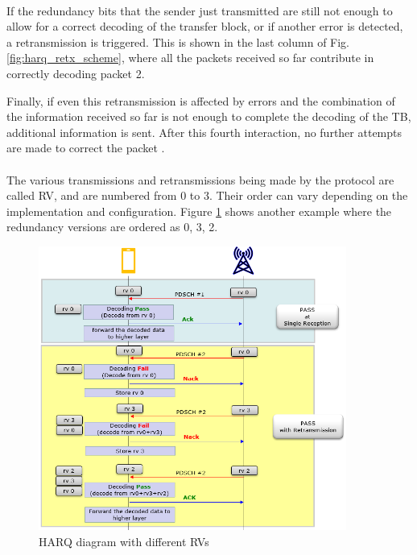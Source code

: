 \paragraph{} If the redundancy bits that the sender just transmitted are still not enough to allow for a correct decoding of the transfer block, or if another error is detected, a retransmission is triggered. This is shown in the last column of Fig. \ref{fig:harq_retx_scheme}, where all the packets received so far contribute in correctly decoding packet 2.

Finally, if even this retransmission is affected by errors and the combination of the information received so far is not enough to complete the decoding of the \ac{TB}, additional information is sent. After this fourth interaction, no further attempts are made to correct the packet \cite{5g-nr-harq-sharetechnote}.

\paragraph{} The various transmissions and retransmissions being made by the protocol are called \ac{RV}, and are numbered from 0 to 3. Their order can vary depending on the implementation and configuration. Figure \ref{fig:harq_retx_scheme_2} shows another example where the redundancy versions are ordered as 0, 3, 2.

\begin{figure}[ht]
    \centering
    \includegraphics[width=0.9\textwidth]{res/harq-retx-scheme-2.png}
    \caption{\ac{HARQ} diagram with different RVs\cite{5g-nr-harq-sharetechnote}}
    \label{fig:harq_retx_scheme_2}
\end{figure}



